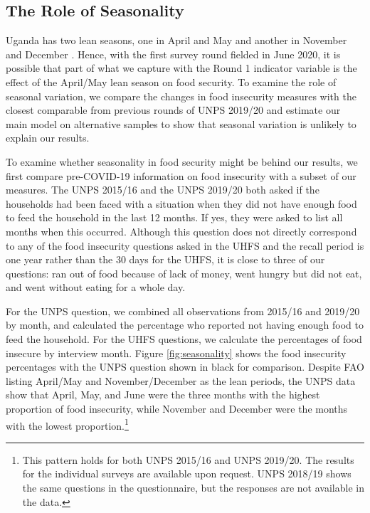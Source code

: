 \documentclass{wber}
\begin{document}
\subsection{The Role of Seasonality}\label{the-role-of-seasonality}

Uganda has two lean seasons, one in April and May and another in
November and December \citep{FAO2022}. Hence, with the first survey
round fielded in June 2020, it is possible that part of what we capture
with the Round 1 indicator variable is the effect of the April/May lean
season on food security. To examine the role of seasonal variation, we
compare the changes in food insecurity measures with the closest
comparable from previous rounds of UNPS 2019/20 and estimate our main
model on alternative samples to show that seasonal variation is unlikely
to explain our results.

To examine whether seasonality in food security might be behind our
results, we first compare pre-COVID-19 information on food insecurity
with a subset of our measures. The UNPS 2015/16 and the UNPS 2019/20
both asked if the households had been faced with a situation when they
did not have enough food to feed the household in the last 12 months. If
yes, they were asked to list all months when this occurred. Although
this question does not directly correspond to any of the food insecurity
questions asked in the UHFS and the recall period is one year rather
than the 30 days for the UHFS, it is close to three of our questions:
ran out of food because of lack of money, went hungry but did not eat,
and went without eating for a whole day.

For the UNPS question, we combined all observations from 2015/16 and
2019/20 by month, and calculated the percentage who reported not having
enough food to feed the household. For the UHFS questions, we calculate
the percentages of food insecure by interview month.
Figure \ref{fig:seasonality} shows the food insecurity percentages with
the UNPS question shown in black for comparison. Despite FAO listing
April/May and November/December as the lean periods, the UNPS data show
that April, May, and June were the three months with the highest
proportion of food insecurity, while November and December were the
months with the lowest proportion.\footnote{This pattern holds for both
  UNPS 2015/16 and UNPS 2019/20. The results for the individual surveys
  are available upon request. UNPS 2018/19 shows the same questions in
  the questionnaire, but the responses are not available in the data.}
\end{document}
